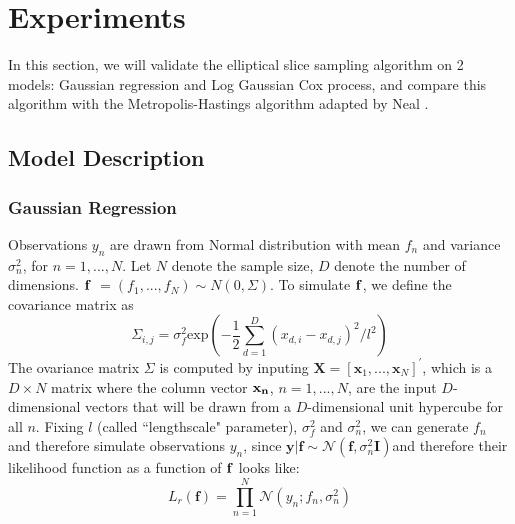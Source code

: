 \documentclass{article}
\begin{document}
\section{Experiments}
In this section, we will validate the elliptical slice sampling algorithm on 2 models: Gaussian regression and Log Gaussian Cox process, and compare this algorithm with the Metropolis-Hastings algorithm adapted by Neal \cite{Neal}.
  
\subsection{Model Description}
\subsubsection{Gaussian Regression}

Observations $y_n$ are drawn from Normal distribution with mean $f_n$ and variance $\sigma_n^2$, for $n = 1,...,N$. Let $N$ denote the sample size, $D$ denote the number of dimensions. $\bf{f}$ $= (f_1,...,f_N) \sim{N(0,\Sigma)}$. To simulate $\bf{f}$, we define the covariance matrix as 
\begin{equation}
\Sigma_{i,j} = \sigma_{f}^{2}\text{exp}\left(-\frac{1}{2}\sum_{d=1}^{D}(x_{d,i} - x_{d,j})^2/l^2\right)
\end{equation}
The ovariance matrix $\Sigma$ is computed by inputing $\mathbf{X}=[\mathbf{x}_1,...,\mathbf{x}_N]^{'}$, which is a $D\times{N}$ matrix where the column vector $\bf{x}_n$, $n = 1,...,N$, are the input $D$-dimensional vectors that will be drawn from a $D$-dimensional unit hypercube for all $n$. 
Fixing $l$ (called ``lengthscale" parameter), $\sigma_{f}^2$ and $\sigma_{n}^2$, we can generate $f_n$ and therefore simulate observations $y_n$, since $\mathbf{y}|\mathbf{f}\sim\mathcal{N}\left(\mathbf{f},\sigma_n^2\mathbf{I}\right)$and therefore their likelihood function as a function of $\bf{f}$ looks like:
\begin{equation}
L_r(\mathbf{f}) = \prod_{n=1}^{N} \mathcal{N}(y_n;f_n,\sigma_n^2)
\end{equation}
\end{document}
